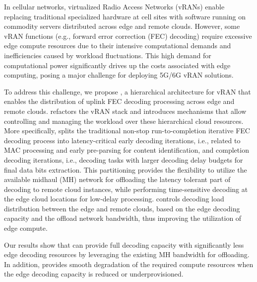 
In cellular networks, virtualized Radio Access Networks (vRANs) enable replacing traditional specialized hardware at cell sites with software running on commodity servers distributed across edge and remote clouds. However, some vRAN functions (e.g., forward error correction (FEC) decoding) require excessive edge compute resources due to their intensive computational demands and inefficiencies caused by workload fluctuations.
This high demand for computational power significantly drives up the costs associated with edge computing, posing a major challenge for deploying 5G/6G vRAN solutions.

To address this challenge, we propose \Name{}, a hierarchical architecture for vRAN that enables the distribution of uplink FEC decoding processing across edge and remote clouds. \Name{} refactors the vRAN stack and introduces mechanisms that allow controlling and managing the workload over these hierarchical cloud resources.
More specifically, \Name{} splits the traditional non-stop run-to-completion iterative FEC decoding process into latency-critical early decoding iterations, i.e., related to MAC processing and early pre-parsing for content identification, and completion decoding iterations, i.e., decoding tasks with larger decoding delay budgets for final data bits extraction. This partitioning provides \Name{} the flexibility to utilize the available midhaul (MH) network for offloading the latency tolerant part of decoding to remote cloud instances, while performing time-sensitive decoding at the edge cloud locations for low-delay processing.
\Name{} controls decoding load distribution between the edge and remote clouds, based on the edge decoding capacity and the offload network bandwidth, thus improving the utilization of edge compute. %

Our results show that \Name{} can provide full decoding capacity with significantly less edge decoding resources by leveraging the existing MH bandwidth for offloading.
In addition, \Name{} provides smooth degradation of the required compute resources when the edge decoding capacity is reduced or underprovisioned. 
